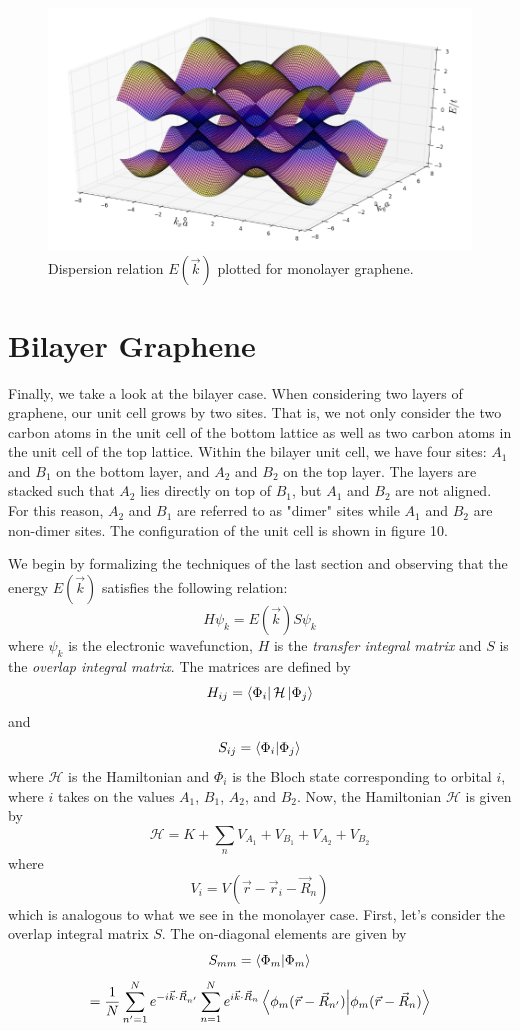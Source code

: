 \documentclass{article}
\begin{document}
\begin{figure}[h]
\centering
\includegraphics[scale=.42]{monolayer_disp_small}
\caption{Dispersion relation $E(\vec{k})$ plotted for monolayer graphene. }
\end{figure}
\section{Bilayer Graphene}
Finally, we take a look at the bilayer case. When considering two layers of graphene, our unit cell grows by two sites. That is, we not only consider the
two carbon atoms in the unit cell of the bottom lattice as well as two carbon atoms in the unit cell of the top lattice. Within the bilayer unit cell,
we have four sites: $A_{1}$ and $B_{1}$ on the bottom layer, and $A_{2}$ and $B_{2}$ on the top layer. The layers are stacked such that $A_{2}$ lies
directly on top of $B_{1}$, but $A_{1}$ and $B_{2}$ are not aligned. For this reason, $A_{2}$ and $B_{1}$ are referred to as "dimer" sites while
$A_{1}$ and $B_{2}$ are non-dimer sites. The configuration of the unit cell is shown in figure 10. \par
We begin by formalizing the techniques of the last section and observing that the energy $E(\vec{k})$ satisfies the following relation:
$$H\psi_{k}=E(\vec{k})S\psi_{k}$$
where $\psi_{k}$ is the electronic wavefunction, $H$ is the \emph{transfer integral matrix} and $S$ is the \emph{overlap integral matrix}. The
matrices are defined by
$$H_{ij} = \bra{\Phi_{i}}\mathcal{H}\ket{\Phi_{j}}$$
and
$$S_{ij} = \bra{\Phi_{i}}\ket{\Phi_{j}}$$
where $\mathcal{H}$ is the Hamiltonian and $\Phi_{i}$ is the Bloch state corresponding to orbital $i$, where $i$ takes on the values $A_{1}$, $B_{1}$, $A_{2}$, and $B_{2}$. Now, the Hamiltonian $\mathcal{H}$
is given by
$$ \mathcal{H} = K + \sum_{n}V_{A_{1}} + V_{B_{1}} + V_{A_{2}} + V_{B_{2}} $$
where
$$V_{i} = V(\vec{r} - \vec{r}_{i} - \vec{R}_n)$$
which is analogous to what we see in the monolayer case. First, let's consider the overlap integral matrix $S$. The on-diagonal elements are
given by
$$S_{mm} = \bra{\Phi_{m}}\ket{\Phi_{m}}$$
$$ = \frac{1}{N} \sum_{n'=1}^{N} e^{-i\vec{k}\cdot\vec{R}_{n'}} \sum_{n=1}^{N} e^{i\vec{k}\cdot\vec{R}_{n}} \bra{\phi_{m}(\vec{r} - \vec{R}_{n'})}\ket{\phi_{m}(\vec{r} - \vec{R}_{n})} $$
\end{document}

